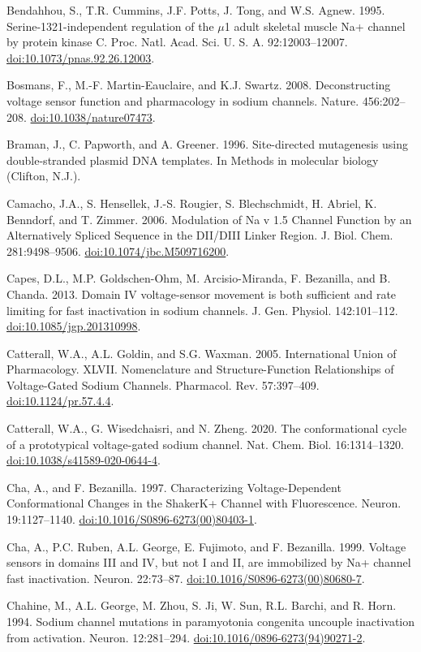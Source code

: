 \begin{hangparas}{.25in}{1}
Bendahhou, S., T.R. Cummins, J.F. Potts, J. Tong, and W.S. Agnew. 1995. Serine-1321-independent regulation of the $\mu$1 adult skeletal muscle Na+ channel by protein kinase C. Proc. Natl. Acad. Sci. U. S. A. 92:12003–12007. \url{doi:10.1073/pnas.92.26.12003}.

Bosmans, F., M.-F. Martin-Eauclaire, and K.J. Swartz. 2008. Deconstructing voltage sensor function and pharmacology in sodium channels. Nature. 456:202–208. \url{doi:10.1038/nature07473}.

Braman, J., C. Papworth, and A. Greener. 1996. Site-directed mutagenesis using double-stranded plasmid DNA templates. In Methods in molecular biology (Clifton, N.J.).

Camacho, J.A., S. Hensellek, J.-S. Rougier, S. Blechschmidt, H. Abriel, K. Benndorf, and T. Zimmer. 2006. Modulation of Na v 1.5 Channel Function by an Alternatively Spliced Sequence in the DII/DIII Linker Region. J. Biol. Chem. 281:9498–9506. \url{doi:10.1074/jbc.M509716200}.

Capes, D.L., M.P. Goldschen-Ohm, M. Arcisio-Miranda, F. Bezanilla, and B. Chanda. 2013. Domain IV voltage-sensor movement is both sufficient and rate limiting for fast inactivation in sodium channels. J. Gen. Physiol. 142:101–112. \url{doi:10.1085/jgp.201310998}.

Catterall, W.A., A.L. Goldin, and S.G. Waxman. 2005. International Union of Pharmacology. XLVII. Nomenclature and Structure-Function Relationships of Voltage-Gated Sodium Channels. Pharmacol. Rev. 57:397–409. \url{doi:10.1124/pr.57.4.4}.

Catterall, W.A., G. Wisedchaisri, and N. Zheng. 2020. The conformational cycle of a prototypical voltage-gated sodium channel. Nat. Chem. Biol. 16:1314–1320. \url{doi:10.1038/s41589-020-0644-4}.

Cha, A., and F. Bezanilla. 1997. Characterizing Voltage-Dependent Conformational Changes in the ShakerK+ Channel with Fluorescence. Neuron. 19:1127–1140. \url{doi:10.1016/S0896-6273(00)80403-1}.

Cha, A., P.C. Ruben, A.L. George, E. Fujimoto, and F. Bezanilla. 1999. Voltage sensors in domains III and IV, but not I and II, are immobilized by Na+ channel fast inactivation. Neuron. 22:73–87. \url{doi:10.1016/S0896-6273(00)80680-7}.

Chahine, M., A.L. George, M. Zhou, S. Ji, W. Sun, R.L. Barchi, and R. Horn. 1994. Sodium channel mutations in paramyotonia congenita uncouple inactivation from activation. Neuron. 12:281–294. \url{doi:10.1016/0896-6273(94)90271-2}.


\end{hangparas}
